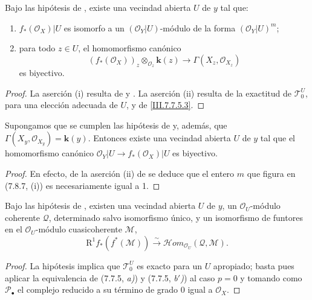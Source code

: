 \begin{corollary}[7.8.7]
\label{III.7.8.7}
Bajo las hipótesis de \textup{}, existe una vecindad abierta
$U$ de $y$ tal que:
\begin{enumerate}
  \item[\textup{(i)}] $f_*(\mathscr O_X)|U$ es isomorfo a un
    $(\mathscr O_Y|U)$-módulo de la forma $(\mathscr O_Y|U)^m$;
  \item[\textup{(ii)}] para todo $z\in U$, el homomorfismo canónico
    \[
      (f_*(\mathscr O_X))_z
      \otimes_{\mathscr O_z}\boldsymbol{k}(z)
      \longrightarrow
      \Gamma(X_z,\mathscr O_{X_z})
    \]
    es biyectivo.
\end{enumerate}
\end{corollary}

\begin{proof}
La aserción (i) resulta de  y .
La aserción (ii) resulta de la exactitud de $\mathscr T_0^U$, para
una elección adecuada de $U$, y de \eqref{III.7.7.5.3}.
\end{proof}

\begin{corollary}[7.8.8]
\label{III.7.8.8}
Supongamos que se cumplen las hipótesis de \textup{} y,
además, que
$\Gamma(X_y,\mathscr O_{X_y})=\boldsymbol{k}(y)$.
Entonces existe una vecindad abierta $U$ de $y$ tal que el
homomorfismo canónico
$\mathscr O_Y|U\to f_*(\mathscr O_X)|U$
es biyectivo.
\end{corollary}

\begin{proof}
En efecto, de la aserción (ii) de  se deduce que el
entero $m$ que figura en (7.8.7,
(i)) es necesariamente igual a 1.
\end{proof}

\begin{corollary}[7.8.9]
\label{III.7.8.9}
Bajo las hipótesis de \textup{}, existen una vecindad abierta
$U$ de $y$, un $\mathscr O_U$-módulo coherente $\mathscr Q$,
determinado salvo isomorfismo único, y un isomorfismo de funtores en
el $\mathscr O_U$-módulo cuasicoherente $\mathscr M$,
\[
  \mathrm R^1f_*(f^*(\mathscr M))
  \xrightarrow{\sim}
  \mathscr{H}\!om_{\mathscr O_U}(\mathscr Q,\mathscr M).
  \tag{7.8.9.1}\label{III.7.8.9.1.fr}
\]
\end{corollary}

\begin{proof}
La hipótesis implica que $\mathscr T_0^U$ es exacto para un $U$
apropiado; basta pues aplicar la equivalencia de (7.7.5, \emph{a)}) y
(7.7.5, \emph{b$'$)}) al caso $p=0$ y tomando como
$\mathscr P_\bullet$ el complejo
reducido a su término de grado 0 igual a $\mathscr O_X$.
\end{proof}

